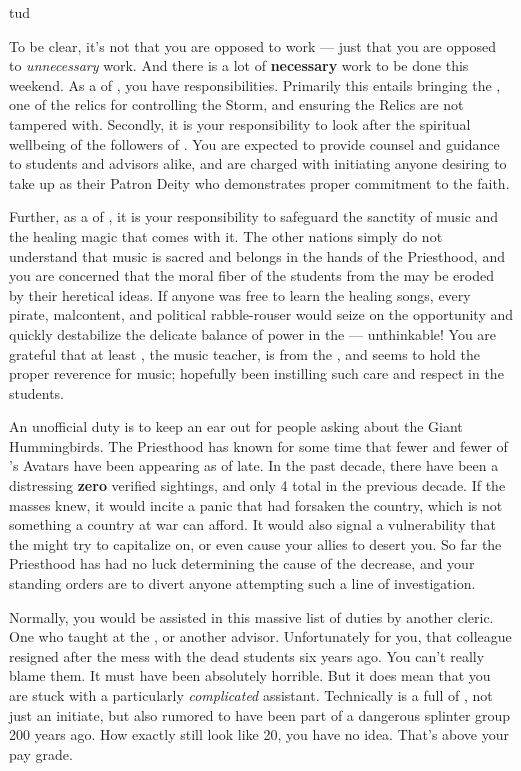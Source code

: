 tud\documentclass[char]{GL2020}
\begin{document}
To be clear, it's not that you are opposed to work — just that you are opposed to \emph{unnecessary} work. And there is a lot of \textbf{necessary} work to be done this weekend. As a \cHedonist{\cleric} of \cFarmGod{}, you have responsibilities. Primarily this entails bringing the \iPitcher{}, one of the \pFarm{} relics for controlling the Storm, and ensuring the Relics are not tampered with. Secondly, it is your responsibility to look after the spiritual wellbeing of the followers of \cFarmGod{}. You are expected to provide counsel and guidance to students and advisors alike, and are charged with initiating anyone desiring to take up \cFarmGod{} as their Patron Deity who demonstrates proper commitment to the faith. 

Further, as a \cHedonist{\cleric} of \cFarmGod{}, it is your responsibility to safeguard the sanctity of music and the healing magic that comes with it. The other nations simply do not understand that music is sacred and belongs in the hands of the Priesthood, and you are concerned that the moral fiber of the students from the \pFarm{} may be eroded by their heretical ideas. If anyone was free to learn the healing songs, every pirate, malcontent, and political rabble-rouser would seize on the opportunity and quickly destabilize the delicate balance of power in the \pFarm{} — unthinkable! You are grateful that at least \cMusic{\full}, the music teacher, is from the \pFarm{}, and seems to hold the proper reverence for music; hopefully \cMusic{\theyhave} been instilling such care and respect in the students.

An unofficial duty is to keep an ear out for people asking about the Giant Hummingbirds. The Priesthood has known for some time that fewer and fewer of \cFarmGod{}'s Avatars have been appearing as of late. In the past decade, there have been a distressing \textbf{zero} verified sightings, and only 4 total in the previous decade. If the masses knew, it would incite a panic that \cFarmGod{} had forsaken the country, which is not something a country at war can afford. It would also signal a vulnerability that the \pShippies{} might try to capitalize on, or even cause your \pTech{} allies to desert you. So far the Priesthood has had no luck determining the cause of the decrease, and your standing orders are to divert anyone attempting such a line of investigation.

Normally, you would be assisted in this massive list of duties by another cleric. One who taught at the \pSchool{}, or another advisor. Unfortunately for you, that colleague resigned after the mess with the dead students six years ago. You can’t really blame them. It must have been absolutely horrible. But it does mean that you are stuck with a particularly \emph{complicated} assistant. Technically \cDisney{} is a full \cDisney{\cleric} of \cFarmGod{}, not just an initiate, but \cDisney{\theyare} also rumored to have been part of a dangerous splinter group 200 years ago. How exactly \cDisney{\they} still look\cDisney{\verbs} like \cDisney{\theyare} 20, you have no idea. That’s above your pay grade.
\end{document}
